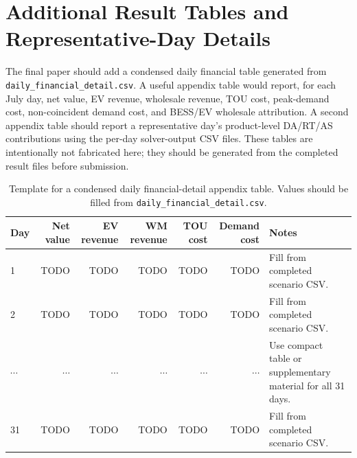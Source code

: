 \documentclass[final,5p,times]{elsarticle}
\begin{document}
\section{Additional Result Tables and Representative-Day Details}
\label{app:result_tables}

The final paper should add a condensed daily financial table generated from \texttt{daily\_financial\_detail.csv}. A useful appendix table would report, for each July day, net value, EV revenue, wholesale revenue, TOU cost, peak-demand cost, non-coincident demand cost, and BESS/EV wholesale attribution. A second appendix table should report a representative day's product-level DA/RT/AS contributions using the per-day solver-output CSV files. These tables are intentionally not fabricated here; they should be generated from the completed result files before submission.

\begin{table}[!t]
\centering
\caption{Template for a condensed daily financial-detail appendix table. Values should be filled from \texttt{daily\_financial\_detail.csv}.}
\label{tab:daily_detail_template}
\scriptsize
\begin{tabularx}{\textwidth}{@{}p{}rrrrrX@{}}
\toprule
Day & Net value & EV revenue & WM revenue & TOU cost & Demand cost & Notes \\
\midrule
1 & TODO & TODO & TODO & TODO & TODO & Fill from completed scenario CSV.\\
2 & TODO & TODO & TODO & TODO & TODO & Fill from completed scenario CSV.\\
$\cdots$ & $\cdots$ & $\cdots$ & $\cdots$ & $\cdots$ & $\cdots$ & Use compact table or supplementary material for all 31 days.\\
31 & TODO & TODO & TODO & TODO & TODO & Fill from completed scenario CSV.\\
\bottomrule
\end{tabularx}
\end{table}


\balance


\end{document}
